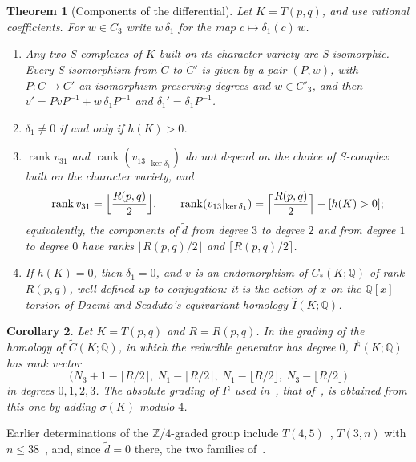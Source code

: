 \documentclass[11pt,reqno]{amsart}
\theoremstyle{plain}
\newtheorem{theorem}{Theorem}[section]
\newtheorem{corollary}[theorem]{Corollary}
\theoremstyle{definition}
\newcommand{\Z}{\mathbb{Z}}
\newcommand{\Q}{\mathbb{Q}}
\newcommand{\Inat}{I^{\natural}}
\newcommand{\td}{\widetilde d}
\newcommand{\tC}{\widetilde C}
\begin{document}
\begin{theorem}[Components of the differential]\label{thm:split}
Let $K=T(p,q)$, and use rational coefficients. For $w\in C_3$ write $w\,\delta_1$ for the map
$c\mapsto\delta_1(c)\,w$.
\begin{enumerate}
\item Any two S-complexes of $K$ built on its character variety are S-isomorphic. Every S-isomorphism
from $\tC$ to $\tC'$ is given by a pair $(P,w)$, with $P\colon C\to C'$ an isomorphism preserving degrees and
$w\in C'_3$, and then $v'=PvP^{-1}+w\,\delta_1P^{-1}$ and $\delta_1'=\delta_1P^{-1}$.
\item \cite[Prop.~4.15]{DSEquiv} $\delta_1\neq0$ if and only if $h(K)>0$.
\item $\operatorname{rank}v_{31}$ and $\operatorname{rank}(v_{13}|_{\ker\delta_1})$ do not depend on the
choice of S-complex built on the character variety, and
\[
\operatorname{rank}v_{31}=\Bigl\lfloor\frac{R(p,q)}2\Bigr\rfloor,\qquad
\operatorname{rank}(v_{13}|_{\ker\delta_1})=\Bigl\lceil\frac{R(p,q)}2\Bigr\rceil-[h(K)>0];
\]
equivalently, the components of $\td$ from degree $3$ to degree $2$ and from degree $1$ to degree $0$
have ranks $\lfloor R(p,q)/2\rfloor$ and $\lceil R(p,q)/2\rceil$.
\item If $h(K)=0$, then $\delta_1=0$, and $v$ is an endomorphism of $C_*(K;\Q)$ of rank $R(p,q)$, well
defined up to conjugation: it is the action of $x$ on the $\Q[x]$-torsion of Daemi and Scaduto's
equivariant homology $\widehat I(K;\Q)$.
\end{enumerate}
\end{theorem}

\begin{corollary}\label{cor:graded}
Let $K=T(p,q)$ and $R=R(p,q)$. In the grading of the homology of $\tC(K;\Q)$, in which the reducible
generator has degree $0$, $\Inat(K;\Q)$ has rank vector
\[
\bigl(N_3+1-\lceil R/2\rceil,\ N_1-\lceil R/2\rceil,\ N_1-\lfloor R/2\rfloor,\ N_3-\lfloor R/2\rfloor\bigr)
\]
in degrees $0,1,2,3$. The absolute grading of $\Inat$ used in~\cite[Thm.~8.9]{DSEquiv}, that
of~\cite[\S4.5]{KM2}, is obtained from this one by adding $\sigma(K)$ modulo $4$.
\end{corollary}

Earlier determinations of the $\Z/4$-graded group include $T(4,5)$~\cite[\S11]{KMfilt}, $T(3,n)$ with
$n\le38$~\cite[\S12.4]{HHK1}, and, since $\td=0$ there, the two families of~\cite[Prop.~9.37]{DSEquiv}.
\end{document}
